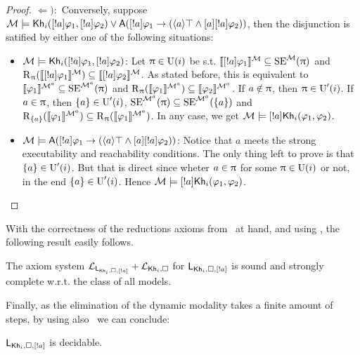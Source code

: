\begin{proof}
$\Leftarrow):$ Conversely, suppose $\modults \models \khi(\srefbox{a} \varphi_1,\srefbox{a} \varphi_2) \vee \A(\srefbox{a} \varphi_1 \ra (\mldiam{a}\top \wedge \mlbox{a} \srefbox{a}\varphi_2))$, then the disjunction is satified by either one of the following situations:
\begin{itemize}
    \item $\modults \models \khi(\srefbox{a} \varphi_1,\srefbox{a} \varphi_2)$: Let $\plans \in \Unc(i)$ be s.t. $\truthset{\modults}{\srefbox{a}\varphi_1} \subseteq \stexec^\modults(\plans)$ and $\R_\plans(\truthset{\modults}{\srefbox{a}\varphi_1}) \subseteq \truthset{\modults}{\srefbox{a}\varphi_2}$.
    As stated before, this is equivalent to $\truthset{\modults^a}{\varphi_1} \subseteq \stexec^{\modults^a}(\plans)$ and $\R_\plans(\truthset{\modults^a}{\varphi_1}) \subseteq \truthset{\modults^a}{\varphi_2}$.
    If $a \notin \plans$, then $\plans \in \Unc'(i)$.
    If $a \in \plans$, then $\set{a} \in \Unc'(i)$, $\stexec^{\modults^a}(\plans) \subseteq \stexec^{\modults^a}(\set{a})$ and $\R_{\set{a}}(\truthset{\modults^a}{\varphi_1}) \subseteq \R_\plans(\truthset{\modults^a}{\varphi_1})$. In any case, we get $\modults \models \srefbox{a}\khi(\varphi_1,\varphi_2)$.

    \item $\modults \models \A(\srefbox{a} \varphi_1 \ra (\mldiam{a}\top \wedge \mlbox{a} \srefbox{a}\varphi_2))$: Notice that $a$ meets the strong executability and reachability conditions.
    The only thing left to prove is that $\set{a} \in \Unc'(i)$. But that is direct since wheter $a \in \plans$ for some $\plans \in \Unc(i)$ or not, in the end $\set{a} \in \Unc'(i)$. Hence $\modults \models \srefbox{a}\khi(\varphi_1,\varphi_2)$.
\end{itemize}
\end{proof}

With the correctness of the reductions axioms from~ at hand, and using , the following result easily follows.

\begin{theorem}\label{th:sscomplete}
The axiom system $\axset_{\AtomReflogic}+\axset_{\khi,\square}$ for $\AtomReflogic$ is sound and strongly complete w.r.t. the class of all models.
\end{theorem}

Finally, as the elimination of the dynamic modality takes a finite amount of steps, by using also~ we can conclude:

\begin{corollary}
$\AtomReflogic$ is decidable.
\end{corollary} 
